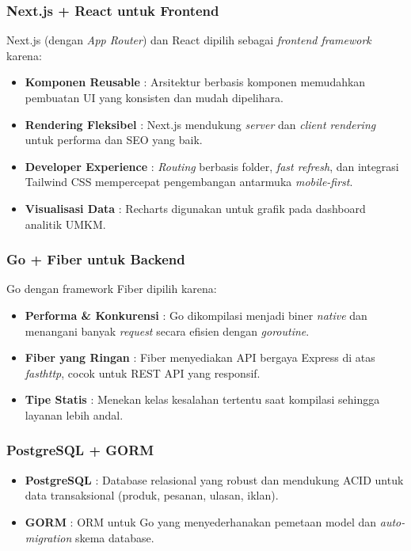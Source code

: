 \subsubsection{Next.js + React untuk Frontend}
Next.js (dengan \textit{App Router}) dan React dipilih sebagai \textit{frontend framework} karena:
\begin{itemize}[leftmargin=*]
    \item \textbf{Komponen Reusable} : Arsitektur berbasis komponen memudahkan pembuatan UI yang konsisten dan mudah dipelihara.
    \item \textbf{Rendering Fleksibel} : Next.js mendukung \textit{server} dan \textit{client rendering} untuk performa dan SEO yang baik.
    \item \textbf{Developer Experience} : \textit{Routing} berbasis folder, \textit{fast refresh}, dan integrasi Tailwind CSS mempercepat pengembangan antarmuka \textit{mobile-first}.
    \item \textbf{Visualisasi Data} : Recharts digunakan untuk grafik pada dashboard analitik UMKM.
\end{itemize}

\subsubsection{Go + Fiber untuk Backend}
Go dengan framework Fiber dipilih karena:
\begin{itemize}[leftmargin=*]
    \item \textbf{Performa \& Konkurensi} : Go dikompilasi menjadi biner \textit{native} dan menangani banyak \textit{request} secara efisien dengan \textit{goroutine}.
    \item \textbf{Fiber yang Ringan} : Fiber menyediakan API bergaya Express di atas \textit{fasthttp}, cocok untuk REST API yang responsif.
    \item \textbf{Tipe Statis} : Menekan kelas kesalahan tertentu saat kompilasi sehingga layanan lebih andal.
\end{itemize}

\subsubsection{PostgreSQL + GORM}
\begin{itemize}[leftmargin=*]
    \item \textbf{PostgreSQL} : Database relasional yang robust dan mendukung ACID untuk data transaksional (produk, pesanan, ulasan, iklan).
    \item \textbf{GORM} : ORM untuk Go yang menyederhanakan pemetaan model dan \textit{auto-migration} skema database.
\end{itemize}


